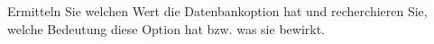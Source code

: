 \item Ermitteln Sie welchen Wert die Datenbankoption 
hat und recherchieren Sie, welche Bedeutung diese Option hat bzw. was sie
bewirkt.
